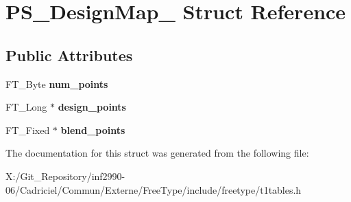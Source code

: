 \hypertarget{struct_p_s___design_map__}{\section{P\-S\-\_\-\-Design\-Map\-\_\- Struct Reference}
\label{struct_p_s___design_map__}
}
\subsection*{Public Attributes}
\begin{DoxyCompactItemize}
\item 
\hypertarget{struct_p_s___design_map___a505a70dd0f497f177fffca9bc4e5d0a5}{F\-T\-\_\-\-Byte {\bfseries num\-\_\-points}}\label{struct_p_s___design_map___a505a70dd0f497f177fffca9bc4e5d0a5}

\item 
\hypertarget{struct_p_s___design_map___abd7a86ba33248ceed657c31063b49679}{F\-T\-\_\-\-Long $\ast$ {\bfseries design\-\_\-points}}\label{struct_p_s___design_map___abd7a86ba33248ceed657c31063b49679}

\item 
\hypertarget{struct_p_s___design_map___a74a555fb4315fca7477f6d20d49686ec}{F\-T\-\_\-\-Fixed $\ast$ {\bfseries blend\-\_\-points}}\label{struct_p_s___design_map___a74a555fb4315fca7477f6d20d49686ec}

\end{DoxyCompactItemize}


The documentation for this struct was generated from the following file\-:\begin{DoxyCompactItemize}
\item 
X\-:/\-Git\-\_\-\-Repository/inf2990-\/06/\-Cadriciel/\-Commun/\-Externe/\-Free\-Type/include/freetype/t1tables.\-h\end{DoxyCompactItemize}
